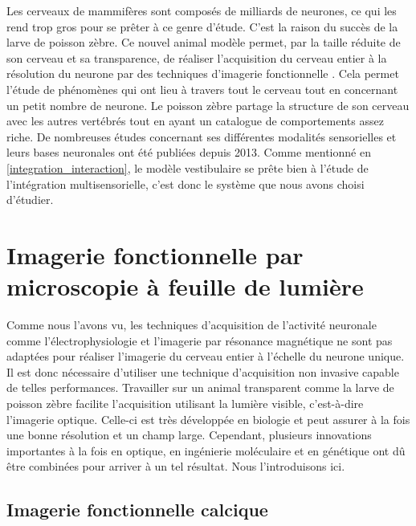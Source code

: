 Les cerveaux de mammifères sont composés de milliards de neurones, ce qui les rend trop gros pour se prêter à ce genre d'étude. C'est la raison du succès de la larve de poisson zèbre. Ce nouvel animal modèle permet, par la taille réduite de son cerveau et sa transparence, de réaliser l'acquisition du cerveau entier à la résolution du neurone par des techniques d'imagerie fonctionnelle \cite{panier_fast_2013}. Cela permet l'étude de phénomènes qui ont lieu à travers tout le cerveau tout en concernant un petit nombre de neurone. Le poisson zèbre partage la structure de son cerveau avec les autres vertébrés tout en ayant un catalogue de comportements assez riche. De nombreuses études concernant ses différentes modalités sensorielles et leurs bases neuronales ont été publiées depuis 2013. Comme mentionné en \ref{integration_interaction}, le modèle vestibulaire se prête bien à l'étude de l'intégration multisensorielle, c'est donc le système que nous avons choisi d'étudier.


\section[Imagerie fonctionnelle]{Imagerie fonctionnelle par microscopie à feuille de lumière}

Comme nous l'avons vu, les techniques d'acquisition de l'activité neuronale comme l'électrophysiologie et l'imagerie par résonance magnétique ne sont pas adaptées pour réaliser l'imagerie du cerveau entier à l'échelle du neurone unique. Il est donc nécessaire d'utiliser une technique d'acquisition non invasive capable de telles performances. Travailler sur un animal transparent comme la larve de poisson zèbre facilite l'acquisition utilisant la lumière visible, c'est-à-dire l'imagerie optique. Celle-ci est très développée en biologie et peut assurer à la fois une bonne résolution et un champ large. Cependant, plusieurs innovations importantes à la fois en optique, en ingénierie moléculaire et en génétique ont dû être combinées pour arriver à un tel résultat. Nous l'introduisons ici.

\subsection{Imagerie fonctionnelle calcique}

